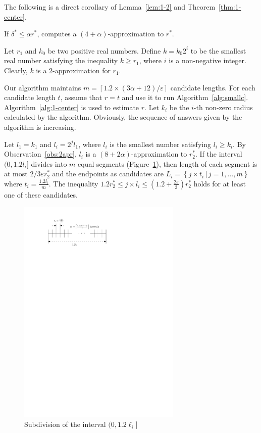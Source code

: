 \documentclass[envcountsame]{cls/cccg15}
\newcommand{\set}[1]{\left\{ #1 \right\}}
\newcommand{\ceil}[1]{\left\lceil{#1}\right\rceil}
\newcommand{\provided}{\,|\,}
\newcommand{\lee}{\leqslant}
\newcommand{\gee}{\geqslant}
\renewcommand{\le}{\lee}
\renewcommand{\ge}{\gee}
\newcommand{\eps}{\varepsilon}
\begin{document}
\noindent 
The following is a direct corollary of Lemma~\ref{lem:1-2} and Theorem~\ref{thm:1-center}.

\begin{cor}
	If $\delta^* \le \alpha r^*$, 
	 computes a $(4 + \alpha)$-approximation to $r^*$. 
\end{cor}


\begin{obs}
\label{obs:2apr}
Let $r_1$ and $k_0$ be two positive real numbers. Define $k=k_0 2^i$ to be the smallest real number satisfying the inequality $k \ge r_1$, where $i$ is a non-negative integer. Clearly, $k$ is a $2$-approximation for $r_1$.
\end{obs}


Our algorithm maintains $m=\ceil{{1.2 \times (3 \alpha+12)}/{\eps}}$ candidate lengths.
For each candidate length $t$, assume that $r = t$ and use it to run Algorithm~\ref{alg:smallc}. Algorithm~\ref{alg:1-center} is used to estimate $r$. Let $k_i$ be the $i$-th non-zero radius calculated by the algorithm. Obviously, the sequence of answers given by the algorithm is increasing.

Let $l_1=k_1$ and $l_i=2^j l_1$, where $l_i$ is the smallest number satisfying $l_i \ge k_i$. By Observation~\ref{obs:2apr}, $l_i$ is a $(8 + 2\alpha)$-approximation to $r_2^*$.
If the interval $(0, 1.2 l_i]$ divides into $m$ equal segments (Figure~\ref{fig:findr}), then length of each segment is at most $2/3 \eps r_2^*$ and the endpoints as candidates are $L_i = \set{j \times t_i \provided j = 1, \dots, m}$ where $t_i = \frac{1.2 l_i}{m}$. 
The inequality $1.2 r_2^* \le j \times l_i \le (1.2 + \frac{2\eps}{3})r_2^*$ holds for at least one of these candidates.

\begin{figure}[h]
	\centering
	\includegraphics[width=21em]{figs/findr}
	\caption{Subdivision of the interval $(0, 1.2 \ell_i]$}
	\label{fig:findr}
\end{figure}
\end{document}
